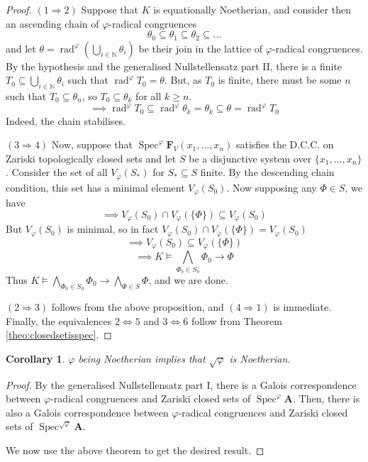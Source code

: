 \documentclass{article}
\theoremstyle{plain}
\newtheorem{corollary}[theorem]{Corollary}
\theoremstyle{definition}
\newcommand{\Spec}{\operatorname{Spec}}
\newcommand{\rad}{\operatorname{rad}}
\begin{document}
\begin{proof}
    $(1\Rightarrow 2)$
    Suppose that $K$ is equationally Noetherian, and consider then an ascending chain of $\varphi$-radical congruences
    $$\theta_0 \subseteq \theta_1 \subseteq \theta_2 \subseteq \dots $$
    and let $\theta = \rad^\varphi (\bigcup_{i \in \mathbb{N}} \theta_i)$ be their join in the lattice of $\varphi$-radical congruences.
    By the hypothesis and the generalised Nullstellensatz part II, there is a finite $T_0 \subseteq \bigcup_{i \in \mathbb{N}} \theta_i$ such that $\rad^\varphi T_0 = \theta$.
    But, as $T_0$ is finite, there must be some $n$ such that $T_0 \subseteq \theta_n$, so $T_0 \subseteq \theta_k$ for all $k\geq n$.
    $$\implies \rad^\varphi T_0 \subseteq \rad^\varphi \theta_k = \theta_k \subseteq \theta = \rad^\varphi T_0$$
    Indeed, the chain stabilises.\par
    $(3\Rightarrow 4)$ 
    Now, suppose that $\Spec^\varphi \mathbf{F}_V(x_1, \dots, x_n)$ satisfies the D.C.C. on Zariski topologically closed sets and let $S$ be a disjunctive system over $\{ x_1, \dots, x_n\}$.
    Consider the set of all $V_\varphi(S_*)$ for $S_* \subseteq S$ finite.
    By the descending chain condition, this set has a minimal element $V_\varphi(S_0)$.
    Now supposing any $\Phi \in S$, we have
    $$\implies V_\varphi(S_0) \cap V_\varphi(\{\Phi\}) \subseteq V_\varphi(S_0)$$
    But $V_\varphi(S_0)$ is minimal, so in fact $V_\varphi(S_0) \cap V_\varphi(\{\Phi\}) = V_\varphi(S_0)$
    $$\implies V_\varphi(S_0) \subseteq V_\varphi(\{ \Phi\})$$
    $$\implies K\models \bigwedge_{\Phi_0 \in S_0} \Phi_0 \rightarrow \Phi$$
    Thus $K\models \bigwedge_{\Phi_0 \in S_0} \Phi_0 \rightarrow \bigwedge_{\Phi \in S} \Phi$, and we are done.\par
    $(2 \Rightarrow 3)$ follows from the above proposition, and $(4\Rightarrow 1)$ is immediate.
    Finally, the equivalences $2\iff 5$ and $3\iff 6$ follow from Theorem \ref{theo:closedsetisspec}.
\end{proof}


\begin{corollary}
    $\varphi$ being Noetherian implies that $\sqrt{\varphi}$ is Noetherian.
\end{corollary}
\begin{proof}
    By the generalised Nullstellensatz part I, there is a Galois correspondence between $\varphi$-radical congruences and Zariski closed sets of $\Spec^\varphi\mathbf{A}$.
    Then, there is also a Galois correspondence between $\varphi$-radical congruences and Zariski closed sets of $\Spec^{\sqrt{\varphi}} \mathbf{A}$.\par
    We now use the above theorem to get the desired result.
\end{proof}
\end{document}
